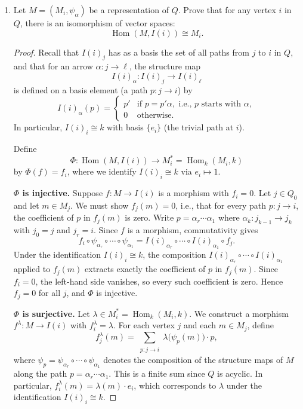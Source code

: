 \documentclass[11pt, a4paper]{article}
\begin{document}
\begin{enumerate}[leftmargin=*, label=\textbf{\arabic*.}]
\begin{proof}
    Therefore
    \[
    0 \longrightarrow \operatorname{rad} P(i) \longrightarrow P(i) \longrightarrow S(i) \longrightarrow 0
    \]
    is a minimal projective resolution.
\end{proof}

\item Let $M=(M_i,\psi_\alpha)$ be a representation of $Q$. Prove that for any vertex $i$ in $Q$, there is an isomorphism of vector spaces:
\[
\operatorname{Hom}(M,I(i)) \cong M_i.
\]

\begin{proof}
    Recall that $I(i)_j$ has as a basis the set of all paths from $j$ to $i$ in $Q$, and that for an arrow $\alpha\colon j\to \ell$, the structure map
    \[
    I(i)_\alpha\colon I(i)_j\to I(i)_\ell
    \]
    is defined on a basis element (a path $p\colon j\to i$) by
    \[
    I(i)_\alpha(p)=
    \begin{cases}
    p' & \text{if } p=p'\alpha, \text{ i.e., } p \text{ starts with } \alpha,\\
    0 & \text{otherwise.}
    \end{cases}
    \]
    In particular, $I(i)_i\cong k$ with basis $\{e_i\}$ (the trivial path at $i$).

    Define
    \[
    \Phi\colon\operatorname{Hom}(M,I(i))\longrightarrow M_i^*=\operatorname{Hom}_k(M_i,k)
    \]
    by $\Phi(f)=f_i$, where we identify $I(i)_i\cong k$ via $e_i\mapsto 1$.
    
    \medskip\noindent\textbf{$\Phi$ is injective.}
    Suppose $f\colon M\to I(i)$ is a morphism with $f_i=0$. Let $j\in Q_0$ and let $m\in M_j$. We must show $f_j(m)=0$, i.e., that for every path $p\colon j\to i$, the coefficient of $p$ in $f_j(m)$ is zero. Write $p=\alpha_r\cdots\alpha_1$ where $\alpha_k\colon j_{k-1}\to j_k$ with $j_0=j$ and $j_r=i$. Since $f$ is a morphism, commutativity gives
    \[
    f_i\circ\psi_{\alpha_r}\circ\cdots\circ\psi_{\alpha_1} = I(i)_{\alpha_r}\circ\cdots\circ I(i)_{\alpha_1}\circ f_j.
    \]
    Under the identification $I(i)_i\cong k$, the composition $I(i)_{\alpha_r}\circ\cdots\circ I(i)_{\alpha_1}$ applied to $f_j(m)$ extracts exactly the coefficient of $p$ in $f_j(m)$. Since $f_i=0$, the left-hand side vanishes, so every such coefficient is zero. Hence $f_j=0$ for all $j$, and $\Phi$ is injective.
    
    \medskip\noindent\textbf{$\Phi$ is surjective.}
    Let $\lambda\in M_i^*=\operatorname{Hom}_k(M_i,k)$. We construct a morphism $f^\lambda\colon M\to I(i)$ with $f^\lambda_i=\lambda$. For each vertex $j$ and each $m\in M_j$, define
    \[
    f^\lambda_j(m)=\sum_{\substack{p\colon j\to i}} \lambda\bigl(\psi_p(m)\bigr)\cdot p,
    \]
    where $\psi_p=\psi_{\alpha_r}\circ\cdots\circ\psi_{\alpha_1}$ denotes the composition of the structure maps of $M$ along the path $p=\alpha_r\cdots\alpha_1$. This is a finite sum since $Q$ is acyclic. In particular, $f^\lambda_i(m)=\lambda(m)\cdot e_i$, which corresponds to $\lambda$ under the identification $I(i)_i\cong k$.
    

\end{proof}
\end{enumerate}
\end{document}
